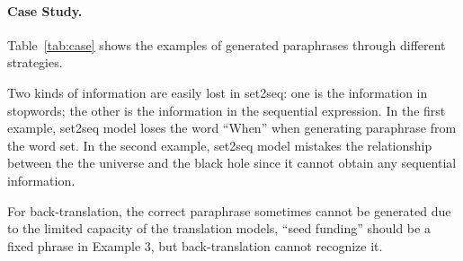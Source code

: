 \paragraph{Case Study. } Table~\ref{tab:case} shows the examples of generated paraphrases through different strategies.

Two kinds of information are easily lost in set2seq: 
one is the information in stopwords; the other is the information in the 
sequential expression. 
In the first example, set2seq model loses the word ``When'' 
when generating paraphrase from the word set. 
In the second example, set2seq model mistakes the relationship between the 
the universe and the black hole since it cannot obtain any sequential information. 

For back-translation, the correct paraphrase sometimes cannot be 
generated due to the limited capacity of the translation models, 
``seed funding'' should be a fixed phrase in Example 3, 
but back-translation cannot recognize it.


